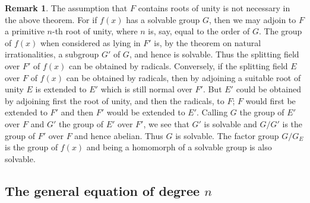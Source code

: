 \documentclass[10pt,leqno]{article}
\theoremstyle{definition}
\newtheorem*{rema}{Remark}
\begin{document}
\begin{rema}
The assumption that $F$ contains roots of unity is not necessary in the above theorem.
For if $f(x)$ has a solvable group $G$, then we may adjoin to $F$ a primitive $n$-th root of unity, where $n$ is, say, equal to the order of $G$.
The group of $f(x)$ when considered as lying in $F'$ is, by the theorem on natural irrationalities, a subgroup $G'$ of $G$, and hence is solvable.
Thus the splitting field over $F'$ of $f(x)$ can be obtained by radicals.
Conversely, if the splitting field $E$ over $F$ of $f(x)$ can be obtained by radicals, then by adjoining a suitable root of unity $E$ is extended to $E'$ which is still normal over $F'$.
But $E'$ could be obtained by adjoining first the root of unity, and then the radicals, to $F$; $F$ would first be extended to $F'$ and then $F'$ would be extended to $E'$.
Calling $G$ the group of $E'$ over $F$ and $G'$ the group of $E'$ over $F'$, we see that $G'$ is solvable and $G / G'$ is the group of $F'$ over $F$ and hence abelian.
Thus $G$ is solvable.
The factor group $G / G_E$ is the group of $f(x)$ and being a homomorph of a solvable group is also solvable.
\end{rema}


\subsection[The general equation of degree n]{The general equation of degree $n$}
\end{document}

